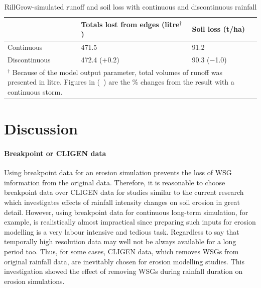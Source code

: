 \begin{table}[htbp]
  \centering
  \caption{RillGrow-simulated runoff and soil loss with continuous and
discontinuous rainfall}
  \label{tab:RillGrowRunoffAndSoilLossWithContAndDiscontRainfall}
    \begin{tabular}{lll}
      \toprule
  & Totals lost from edges (litre$^\dagger$) & Soil loss (t/ha) \\
      \midrule
      Continuous & 471.5 & 91.2 \\
      Discontinuous & 472.4 ($+$0.2)& 90.3 ($-$1.0)\\
      \bottomrule
      \multicolumn{3}{p{11cm}}{\footnotesize $^\dagger$ Because of the model
output parameter, total volumes of runoff was presented in litre. Figures in (\
) are the \% changes from the result with a continuous storm.}
    \end{tabular}
\end{table}

\section{Discussion}
\label{sec:InterStormPeriodsWithinAStormDiscussion}

\paragraph{Breakpoint or CLIGEN data} Using breakpoint data for an erosion
simulation prevents the loss of WSG information from the original data.
Therefore, it is reasonable to choose breakpoint data over CLIGEN data for
studies similar to the current research which investigates effects of rainfall
intensity changes on soil erosion in great detail. However, using breakpoint
data for continuous long-term simulation, for example, is realistically almost
impractical since preparing such inputs for erosion modelling is a very labour
intensive and tedious task. Regardless to say that temporally high resolution
data may well not be always available for a long period too. Thus, for some
cases, CLIGEN data, which removes WSGs from original rainfall data, are
inevitably chosen for erosion modelling studies. This investigation showed the
effect of removing WSGs during rainfall duration on erosion simulations.

